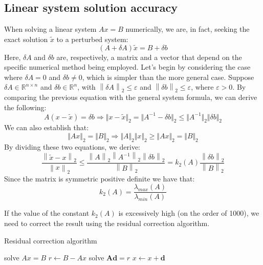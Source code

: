 \subsection*{Linear system solution accuracy}
When solving a linear system $Ax=B$ numerically, we are, in fact, seeking the exact solution $\widetilde{x}$ to a perturbed system:
\[\left( A + \delta A\right)\widetilde{x}=B+\delta b\]
Here, $\delta A$ and $\delta b$ are, respectively, a matrix and a vector that depend on the specific numerical method being employed.
Let's begin by considering the case where $\delta A=0$ and $\delta b\neq 0$, which is simpler than the more general case.
Suppose $\delta A \in \mathbb{R}^{n \times n}$ and $\delta b \in \mathbb{R}^{n}$, with $\left\lVert \delta A \right\rVert_2 \leq \varepsilon$ and $\left\lVert \delta b \right\rVert_2 \leq \varepsilon$, where $\varepsilon > 0$. 
By comparing the previous equation with the general system formula, we can derive the following:
\[A\left(x-\widetilde{x}\right)=\delta b\Rightarrow\Vert x-\widetilde{x} \Vert_2=\Vert A^{-1}-\delta b \Vert_2 \leq \Vert A^{-1} \Vert_2 \Vert \delta b \Vert_2\]
We can also establish that:
\[\Vert Ax\Vert_2=\Vert B\Vert_2 \Rightarrow \Vert A \Vert_2\Vert x \Vert_2 \geq \Vert Ax\Vert_2=\Vert B\Vert_2\]
By dividing these two equations, we derive:
\[\dfrac{\left\lVert \widetilde{x}-x \right\rVert_2}{\left\lVert x \right\rVert_2} \leq \dfrac{\left\lVert A \right\rVert_2\left\lVert A^{-1} \right\rVert_2\left\lVert \delta b \right\rVert_2}{\left\lVert B \right\rVert_2}=k_2(A)\dfrac{\left\lVert \delta b \right\rVert_2}{\left\lVert B \right\rVert_2}\]
Since the matrix is symmetric positive definite we have that: 
\[k_2(A)=\dfrac{\lambda_{max}(A)}{\lambda_{min}(A)}\]

If the value of the constant $k_2(A)$ is excessively high (on the order of 1000), we need to correct the result using the residual correction algorithm.
\begin{algorithm}[H]
    \caption{Residual correction algorithm}
        \begin{algorithmic}[1]
            \State solve $ Ax=B$
            \State $r \leftarrow B- Ax$
            \State solve $\boldsymbol{Ad}=r$
            \State $x \leftarrow x+\boldsymbol{d}$
        \end{algorithmic}
\end{algorithm}